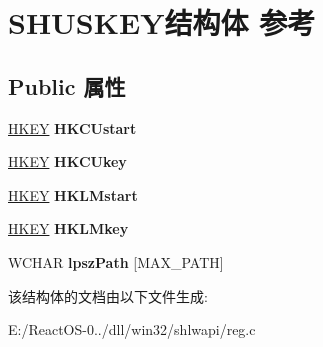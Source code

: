 \hypertarget{struct_s_h_u_s_k_e_y}{}\section{S\+H\+U\+S\+K\+E\+Y结构体 参考}
\label{struct_s_h_u_s_k_e_y}
\subsection*{Public 属性}
\begin{DoxyCompactItemize}
\item 
\mbox{\label{struct_s_h_u_s_k_e_y_aab759535d8a3f0ce9bf40b8410529e8f}} 
\hyperlink{interfacevoid}{H\+K\+EY} {\bfseries H\+K\+C\+Ustart}
\item 
\mbox{\label{struct_s_h_u_s_k_e_y_a217f6a9c18109347ff897eb6c8f36605}} 
\hyperlink{interfacevoid}{H\+K\+EY} {\bfseries H\+K\+C\+Ukey}
\item 
\mbox{\label{struct_s_h_u_s_k_e_y_a554373ff214a2eaa7c30d9b97ee0d777}} 
\hyperlink{interfacevoid}{H\+K\+EY} {\bfseries H\+K\+L\+Mstart}
\item 
\mbox{\label{struct_s_h_u_s_k_e_y_a5e5a4fae1dd0cd9526a568b2a52e745d}} 
\hyperlink{interfacevoid}{H\+K\+EY} {\bfseries H\+K\+L\+Mkey}
\item 
\mbox{\label{struct_s_h_u_s_k_e_y_a236f664163f94d7489017467b0913158}} 
W\+C\+H\+AR {\bfseries lpsz\+Path} \mbox{[}M\+A\+X\+\_\+\+P\+A\+TH\mbox{]}
\end{DoxyCompactItemize}


该结构体的文档由以下文件生成\+:\begin{DoxyCompactItemize}
\item 
E\+:/\+React\+O\+S-\/0../dll/win32/shlwapi/reg.\+c\end{DoxyCompactItemize}
